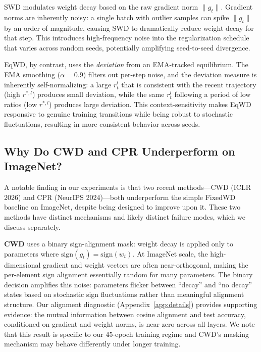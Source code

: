 \documentclass{article}
\begin{document}
SWD modulates weight decay based on the raw gradient norm $\|g_t\|$.
Gradient norms are inherently noisy: a single batch with outlier samples
can spike $\|g_t\|$ by an order of magnitude, causing SWD to
dramatically reduce weight decay for that step. This introduces
high-frequency noise into the regularization schedule that varies across
random seeds, potentially amplifying seed-to-seed divergence.

EqWD, by contrast, uses the \emph{deviation} from an EMA-tracked
equilibrium. The EMA smoothing ($\alpha = 0.9$) filters out per-step
noise, and the deviation measure is inherently self-normalizing: a large
$r_t^l$ that is consistent with the recent trajectory (high
$r^{*,l}$) produces small deviation, while the same $r_t^l$
following a period of low ratios (low $r^{*,l}$) produces large
deviation. This context-sensitivity makes EqWD responsive to genuine
training transitions while being robust to stochastic fluctuations,
resulting in more consistent behavior across seeds.

\subsection{Why Do CWD and CPR Underperform on ImageNet?}
\label{sec:cwd_cpr}

A notable finding in our experiments is that two recent methods---CWD
(ICLR 2026) and CPR (NeurIPS 2024)---both underperform the simple
FixedWD baseline on ImageNet, despite being designed to improve upon it.
These two methods have distinct mechanisms and likely distinct failure
modes, which we discuss separately.

\textbf{CWD} uses a binary sign-alignment mask: weight decay is applied
only to parameters where $\text{sign}(g_t) = \text{sign}(w_t)$. At
ImageNet scale, the high-dimensional gradient and weight vectors are
often near-orthogonal, making the per-element sign alignment essentially
random for many parameters. The binary decision amplifies this noise:
parameters flicker between ``decay'' and ``no decay'' states based on
stochastic sign fluctuations rather than meaningful alignment structure.
Our alignment diagnostic (Appendix~\ref{app:details}) provides supporting evidence: the
mutual information between cosine alignment and test accuracy,
conditioned on gradient and weight norms, is near zero across all
layers. We note that this result is specific to our 45-epoch training
regime and CWD's masking mechanism may behave differently under longer
training.
\end{document}
